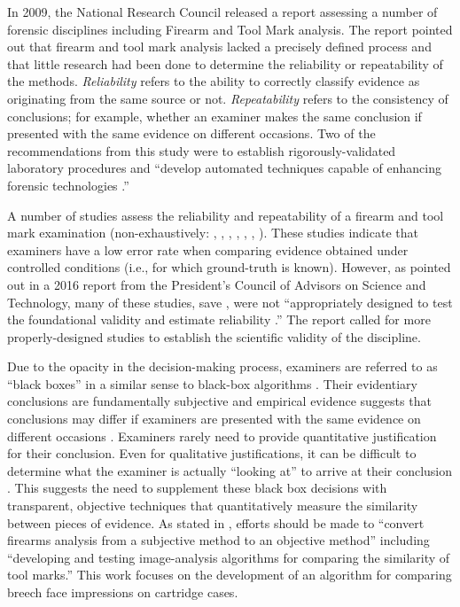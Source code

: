 \documentclass[11pt,]{isuthesis}
\begin{document}
In 2009, the National Research Council released a report assessing a number of forensic disciplines including Firearm and Tool Mark analysis.
The report pointed out that firearm and tool mark analysis lacked a precisely defined process and that little research had been done to determine the reliability or repeatability of the methods.
\emph{Reliability} refers to the ability to correctly classify evidence as originating from the same source or not.
\emph{Repeatability} refers to the consistency of conclusions; for example, whether an examiner makes the same conclusion if presented with the same evidence on different occasions.
Two of the recommendations from this study were to establish rigorously-validated laboratory procedures and ``develop automated techniques capable of enhancing forensic technologies \citep{council_strengthening_2009}.''

A number of studies assess the reliability and repeatability of a firearm and tool mark examination (non-exhaustively: \citet{DeFrance2003}, \citet{Hamby2009}, \citet{fadulempirical2011}, \citet{Stroman2014}, \citet{Baldwin2014}, \citet{Smith2016}, \citet{MATTIJSSEN2020}).
These studies indicate that examiners have a low error rate when comparing evidence obtained under controlled conditions (i.e., for which ground-truth is known).
However, as pointed out in a 2016 report from the President's Council of Advisors on Science and Technology, many of these studies, save \citet{Baldwin2014}, were not ``appropriately designed to test the foundational validity and estimate reliability \citep{pcast2016}.''
The report called for more properly-designed studies to establish the scientific validity of the discipline.

Due to the opacity in the decision-making process, examiners are referred to as ``black boxes'' in a similar sense to black-box algorithms \citep{HumanFactorsCommittee2020}.
Their evidentiary conclusions are fundamentally subjective and empirical evidence suggests that conclusions may differ if examiners are presented with the same evidence on different occasions \citep{Ulery2011, Ulery2012}.
Examiners rarely need to provide quantitative justification for their conclusion.
Even for qualitative justifications, it can be difficult to determine what the examiner is actually ``looking at'' to arrive at their conclusion \citep{Ulery2014}.
This suggests the need to supplement these black box decisions with transparent, objective techniques that quantitatively measure the similarity between pieces of evidence.
As stated in \citet{pcast2016}, efforts should be made to ``convert firearms analysis from a subjective method to an objective method'' including ``developing and testing image-analysis algorithms for comparing the similarity of tool marks.''
This work focuses on the development of an algorithm for comparing breech face impressions on cartridge cases.
\end{document}
